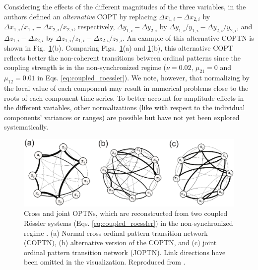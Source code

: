 Considering the effects of the different magnitudes of the three variables, in \cite{Guo2018} the authors defined an {\emph{alternative}} COPT by replacing $\Delta x_{1,i} - \Delta x_{2,i}$ by $\Delta x_{1,i} / x_{1,i} - \Delta x_{2,i} / x_{2,i}$, respectively, $\Delta y_{1,i} - \Delta y_{2,i}$ by $\Delta y_{1,i} / y_{1,i} - \Delta y_{2,i} / y_{2,i}$, and $\Delta z_{1,i} - \Delta z_{2,i}$ by $\Delta z_{1,i} / z_{1,i} - \Delta z_{2,i} / z_{2,i}$. An example of this alternative COPTN is shown in Fig.~\ref{fig:rosCOPT}(b). Comparing Figs.~\ref{fig:rosCOPT}(a) and \ref{fig:rosCOPT}(b), this alternative COPT reflects better the non-coherent transitions between ordinal patterns since the coupling strength is in the non-synchronized regime ($\nu = 0.02$, $\mu_{21} = 0$ and $\mu_{12} = 0.01$ in Eqs. \eqref{eq:coupled_roessler}). We note, however, that normalizing by the local value of each component may result in numerical problems close to the roots of each component time series. To better account for amplitude effects in the different variables, other normalizations (like with respect to the individual components' variances or ranges) are possible but have not yet been explored systematically.
\begin{figure}
	\centering
	\includegraphics[width=\columnwidth]{Chapter05_TransitionNt/copt_jopt.eps}
	\caption{\small{Cross and joint OPTNs, which are reconstructed from two coupled R\"ossler systems (Eqs. \eqref{eq:coupled_roessler}) in the non-synchronized regime \cite{Guo2018}. (a) Normal cross ordinal pattern transition network (COPTN), (b) alternative version of the COPTN, and (c) joint ordinal pattern transition network (JOPTN). Link directions have been omitted in the  visualization. Reproduced from \cite{Guo2018}. } \label{fig:rosCOPT}}
\end{figure}	

